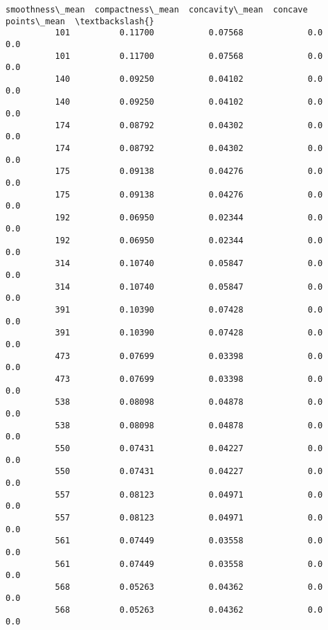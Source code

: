 \documentclass[11pt]{article}
\begin{document}
\begin{Verbatim}[commandchars=\\\{\}]
               smoothness\_mean  compactness\_mean  concavity\_mean  concave points\_mean  \textbackslash{}
          101          0.11700           0.07568             0.0                  0.0   
          101          0.11700           0.07568             0.0                  0.0   
          140          0.09250           0.04102             0.0                  0.0   
          140          0.09250           0.04102             0.0                  0.0   
          174          0.08792           0.04302             0.0                  0.0   
          174          0.08792           0.04302             0.0                  0.0   
          175          0.09138           0.04276             0.0                  0.0   
          175          0.09138           0.04276             0.0                  0.0   
          192          0.06950           0.02344             0.0                  0.0   
          192          0.06950           0.02344             0.0                  0.0   
          314          0.10740           0.05847             0.0                  0.0   
          314          0.10740           0.05847             0.0                  0.0   
          391          0.10390           0.07428             0.0                  0.0   
          391          0.10390           0.07428             0.0                  0.0   
          473          0.07699           0.03398             0.0                  0.0   
          473          0.07699           0.03398             0.0                  0.0   
          538          0.08098           0.04878             0.0                  0.0   
          538          0.08098           0.04878             0.0                  0.0   
          550          0.07431           0.04227             0.0                  0.0   
          550          0.07431           0.04227             0.0                  0.0   
          557          0.08123           0.04971             0.0                  0.0   
          557          0.08123           0.04971             0.0                  0.0   
          561          0.07449           0.03558             0.0                  0.0   
          561          0.07449           0.03558             0.0                  0.0   
          568          0.05263           0.04362             0.0                  0.0   
          568          0.05263           0.04362             0.0                  0.0   
          

\end{Verbatim}
\end{document}
